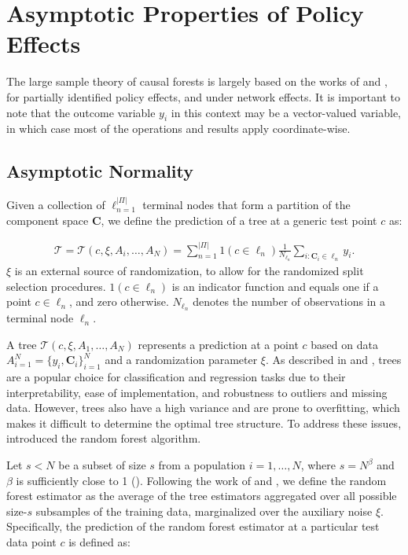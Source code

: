 \documentclass[12pt]{article}
\begin{document}
\section{Asymptotic Properties of Policy Effects}\label{app_main_asymp}

The large sample theory of causal forests is largely based on the works of \cite{wager2018estimation} and \cite{wager2015adaptive}, \cite{nareklishvili2022adaptive} for partially identified policy effects, and \cite{li2020asymptotic} under network effects. It is important to note that the outcome variable $y_i$ in this context may be a vector-valued variable, in which case most of the operations and results apply coordinate-wise. 

\subsection{Asymptotic Normality}\label{app_hoeff}



Given a collection of ${\ell}_{n=1}^{|\Pi|}$ terminal nodes that form a partition of the component space $\mathbf{C}$, we define the prediction of a tree at a generic test point $c$ as:

\begin{align}
     \mathcal{T} = \mathcal{T}(c, \xi, A_i, \dots, A_N) = \sum_{n=1}^{|\Pi|} 1(c\in \ell_n) \frac{1}{N_{\ell_n}}\sum_{i:\mathbf{C}_i\in \ell_n}y_{i}.
\end{align}
$\xi$ is an external source of randomization, to allow for the randomized split selection procedures. $1(c \in \ell_n)$ is an indicator function and equals one if a point $c \in \ell_n$, and zero otherwise. $N_{\ell_n}$ denotes the number of observations in a terminal node $\ell_n$. 

A tree $\mathcal{T}(c, \xi, A_1, \dots, A_N)$ represents a prediction at a point $c$ based on data ${A}_{i = 1}^{N} = \{y_i, \mathbf{C}_i\}_{i = 1}^{N}$ and a randomization parameter $\xi$. As described in \cite{lewis2000introduction} and \cite{kingsford2008decision}, trees are a popular choice for classification and regression tasks due to their interpretability, ease of implementation, and robustness to outliers and missing data. However, trees also have a high variance and are prone to overfitting, which makes it difficult to determine the optimal tree structure. To address these issues, \cite{breiman2001random} introduced the random forest algorithm.

Let $s < N$ be a subset of size $s$ from a population $i = {1, \dots, N}$, where $s = N^{\beta}$ and $\beta$ is sufficiently close to 1 (\citealp{wager2018estimation}). Following the work of \cite{breiman2001random} and \cite{wager2018estimation}, we define the random forest estimator as the average of the tree estimators aggregated over all possible size-$s$ subsamples of the training data, marginalized over the auxiliary noise $\xi$. Specifically, the prediction of the random forest estimator at a particular test data point $c$ is defined as:
\end{document}
